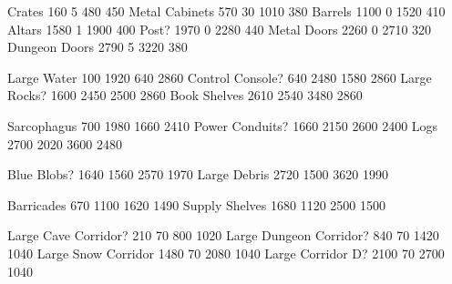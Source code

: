 \documentclass{article}
\begin{document}
  {Crates}   {160 5 480 450}
  {Metal Cabinets} {570 30 1010 380}
  {Barrels}  {1100 0 1520 410}
  {Altars}   {1580 1 1900 400}
  {Post?}    {1970 0 2280 440}
  {Metal Doors}   { 2260 0 2710 320}
  {Dungeon Doors} { 2790 5 3220 380}

\def\tilejpg{terrain-002.jpg}

  {Large Water} {100 1920 640 2860}
  {Control Console?} {640 2480 1580 2860}
  {Large Rocks?} {1600 2450 2500 2860}
  {Book Shelves} {2610 2540 3480 2860}

  {Sarcophagus} {700 1980 1660 2410}
  {Power Conduits?} { 1660 2150 2600 2400}
  {Logs} { 2700 2020 3600 2480}

  {Blue Blobs?} {1640 1560 2570 1970}
  {Large Debris} {2720 1500 3620 1990}

  {Barricades} {670 1100 1620 1490}
  {Supply Shelves} {1680 1120 2500 1500}

  {Large Cave Corridor?} {210 70 800 1020}
  {Large Dungeon Corridor?} {840 70 1420 1040}
  {Large Snow Corridor} {1480 70 2080 1040}
  {Large Corridor D?} {2100 70 2700 1040}


\renewcommand\t{\usebox}

\t\poisontrap
\ \t\spiketrap
\ \t\beartrap
\ \t\icyspikes
\ \t\rubble   
\ \t\stalagmites
\ \t\greenone   
\ \t\icepiller  
\ \t\nest       
\ \t\snowrock   
\ \t\goldenorb     
\ \t\debris        
\ \t\ladder        
\ \t\snowdrift     
\ \t\lavapit       
\ \t\pressureplate 
\ \t\cavedoor
\ \t\dungcor 
\ \t\snowcor 
\ \t\snowdoor
\ \t\crate    
\ \t\metalcab 
\ \t\barrels  
\ \t\altar    
\ \t\post     
\ \t\metaldoor
\ \t\dundoor  
%
\ \t\largewater   
\ \t\console      
\ \t\largerocks   
\ \t\bookshelf    
%
\ \t\sarcophagus  
\ \t\conduit      
\ \t\logtile
%
\ \t\bblob        
\ \t\largedebris  
%
\ \t\barricade    
\ \t\supplyshelf  
%
\ \t\lgcorrA      
\ \t\lgcorrB      
\ \t\lgsnow       
\ \t\lgcorrD      
\end{document}
